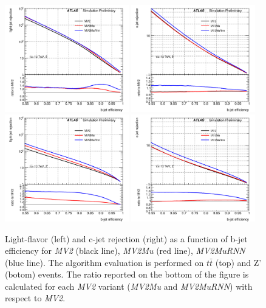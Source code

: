 \begin{figure}[htbp]
  \centering
 \includegraphics[width=0.48\textwidth]{figures/RNN/LRej_ttbar_combtagger.png}
 \includegraphics[width=0.48\textwidth]{figures/RNN/CRej_ttbar_combtagger.png}\\
 \includegraphics[width=0.48\textwidth]{figures/RNN/LRej_Zprime_combtagger.png}
 \includegraphics[width=0.48\textwidth]{figures/RNN/CRej_Zprime_combtagger.png}

 \caption{Light-flavor (left) and c-jet rejection (right) as a function of b-jet efficiency for \textit{MV2} (black line), \textit{MV2Mu} (red line), \textit{MV2MuRNN} (blue line). The algorithm evaluation is performed on $t\bar t$ (top) and Z' (botom) events. The ratio reported on the bottom of the figure is calculated for each \textit{MV2} variant (\textit{MV2Mu} and \textit{MV2MuRNN}) with respect to \textit{MV2}.}
  \label{fig:combtagger}
\end{figure}
